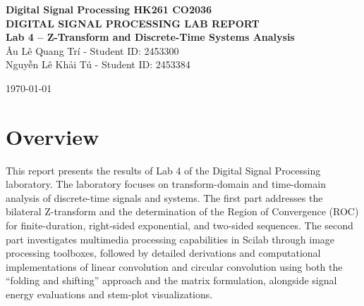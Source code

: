 \documentclass[12pt,a4paper]{article}
\begin{document}
\begin{center}
    \textbf{Digital Signal Processing \hfill HK261 \hfill CO2036}\\[2cm]

    \huge\textbf{DIGITAL SIGNAL PROCESSING LAB REPORT}\\[0.5cm]
    \Large\textbf{Lab 4 -- Z-Transform and Discrete-Time Systems Analysis}\\[1cm]

    \large Âu Lê Quang Trí - Student ID: 2453300\\[0.5cm]
    \large Nguyễn Lê Khải Tú - Student ID: 2453384\\[0.5cm]
    \vspace{0.5cm}

    \large \today\\[2cm]
\end{center}

\section*{Overview}
This report presents the results of Lab 4 of the Digital Signal Processing laboratory. The laboratory focuses on transform-domain and time-domain analysis of discrete-time signals and systems. The first part addresses the bilateral Z-transform and the determination of the Region of Convergence (ROC) for finite-duration, right-sided exponential, and two-sided sequences. The second part investigates multimedia processing capabilities in Scilab through image processing toolboxes, followed by detailed derivations and computational implementations of linear convolution and circular convolution using both the ``folding and shifting'' approach and the matrix formulation, alongside signal energy evaluations and stem-plot visualizations.
\end{document}
